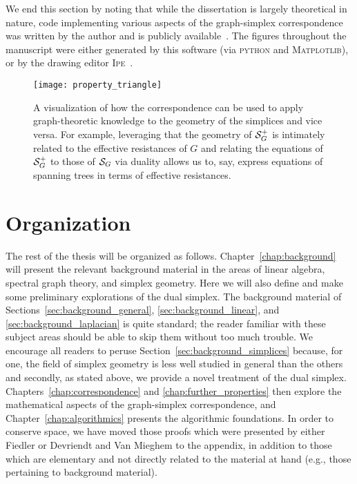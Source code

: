 We  end this  section by noting that while the dissertation is largely theoretical  in nature, code implementing various  aspects of the  graph-simplex correspondence was written by the author and is publicly available~\cite{chugg2019graph}. The figures throughout the manuscript were either generated by this software (via \textsc{python} and \textsc{Matplotlib}),  or by the drawing editor \textsc{Ipe}~\cite{cheong2014ipe}.    

\begin{figure}
	\centering
	\texttt{[image: property\_triangle]}
	\caption{A visualization of how the correspondence can be used to apply graph-theoretic knowledge to the geometry  of the simplices and vice versa. For example, leveraging that the geometry of $\mathcal{S}_G^+$ is intimately related to the effective resistances of $G$ and relating the equations of $\mathcal{S}_G^+$  to those of $\mathcal{S}_G$ via duality allows us  to, say, express equations of spanning trees in terms of effective resistances.  }
	\label{fig:property_triangle}
\end{figure}


\section{Organization}
\label{sec:intro_organization}

The rest of the thesis will be  organized as follows. Chapter~\ref{chap:background} will present the relevant background material in the areas of linear algebra, spectral graph theory, and simplex  geometry. Here we will also define and make some preliminary explorations of the dual simplex. The  background material  of Sections~\ref{sec:background_general}, \ref{sec:background_linear},  and \ref{sec:background_laplacian} is quite standard; the reader familiar with  these subject areas should  be able to skip  them without too much trouble. We  encourage all readers to peruse Section~\ref{sec:background_simplices} because, for one, the field  of simplex geometry is  less  well  studied  in general than the others and secondly, as stated above, we provide a novel treatment of  the dual simplex. Chapters~\ref{chap:correspondence} and \ref{chap:further_properties} then explore the mathematical aspects  of  the graph-simplex correspondence, and Chapter~\ref{chap:algorithmics} presents the algorithmic foundations. In order  to conserve  space, we have moved those proofs which were   presented by either Fiedler or Devriendt and Van Mieghem to the appendix, in addition to those which are elementary and not directly related to the material at  hand (e.g., those pertaining  to background material). 










     

  	
